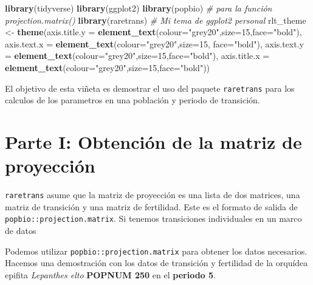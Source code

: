 \documentclass[
]{book}
\newenvironment{Shaded}{\begin{snugshade}}{\end{snugshade}}
\newcommand{\AttributeTok}[1]{\textcolor[rgb]{0.13,0.29,0.53}{#1}}
\newcommand{\CommentTok}[1]{\textcolor[rgb]{0.56,0.35,0.01}{\textit{#1}}}
\newcommand{\DecValTok}[1]{\textcolor[rgb]{0.00,0.00,0.81}{#1}}
\newcommand{\FunctionTok}[1]{\textcolor[rgb]{0.13,0.29,0.53}{\textbf{#1}}}
\newcommand{\NormalTok}[1]{#1}
\newcommand{\OtherTok}[1]{\textcolor[rgb]{0.56,0.35,0.01}{#1}}
\newcommand{\StringTok}[1]{\textcolor[rgb]{0.31,0.60,0.02}{#1}}
\theoremstyle{definition}
\theoremstyle{definition}
\theoremstyle{definition}
\theoremstyle{definition}
\theoremstyle{remark}
\begin{document}
\begin{Shaded}
\begin{Highlighting}[]
\FunctionTok{library}\NormalTok{(tidyverse)}
\FunctionTok{library}\NormalTok{(ggplot2)}
\FunctionTok{library}\NormalTok{(popbio) }\CommentTok{\# para la función projection.matrix()}
\FunctionTok{library}\NormalTok{(raretrans)}
\CommentTok{\# Mi tema de ggplot2 personal}
\NormalTok{rlt\_theme }\OtherTok{\textless{}{-}} \FunctionTok{theme}\NormalTok{(}\AttributeTok{axis.title.y =} \FunctionTok{element\_text}\NormalTok{(}\AttributeTok{colour=}\StringTok{"grey20"}\NormalTok{,}\AttributeTok{size=}\DecValTok{15}\NormalTok{,}\AttributeTok{face=}\StringTok{"bold"}\NormalTok{),}
        \AttributeTok{axis.text.x =} \FunctionTok{element\_text}\NormalTok{(}\AttributeTok{colour=}\StringTok{"grey20"}\NormalTok{,}\AttributeTok{size=}\DecValTok{15}\NormalTok{, }\AttributeTok{face=}\StringTok{"bold"}\NormalTok{),}
        \AttributeTok{axis.text.y =} \FunctionTok{element\_text}\NormalTok{(}\AttributeTok{colour=}\StringTok{"grey20"}\NormalTok{,}\AttributeTok{size=}\DecValTok{15}\NormalTok{,}\AttributeTok{face=}\StringTok{"bold"}\NormalTok{),  }
        \AttributeTok{axis.title.x =} \FunctionTok{element\_text}\NormalTok{(}\AttributeTok{colour=}\StringTok{"grey20"}\NormalTok{,}\AttributeTok{size=}\DecValTok{15}\NormalTok{,}\AttributeTok{face=}\StringTok{"bold"}\NormalTok{))}
\end{Highlighting}
\end{Shaded}

El objetivo de esta viñeta es demostrar el uso del paquete \texttt{raretrans}
para los calculos de los parametros en una población y periodo de
transición.

\hypertarget{parte-i-obtenciuxf3n-de-la-matriz-de-proyecciuxf3n}{%
\section{Parte I: Obtención de la matriz de proyección}\label{parte-i-obtenciuxf3n-de-la-matriz-de-proyecciuxf3n}}

\texttt{raretrans} asume que la matriz de proyección es una lista de dos
matrices, una matriz de transición y una matriz de fertilidad. Este es
el formato de salida de \texttt{popbio::projection.matrix}. Si tenemos
transiciones individuales en un marco de datos

Podemos utilizar \texttt{popbio::projection.matrix} para obtener los datos
necesarios. Hacemos una demostración con los datos de transición y
fertilidad de la orquídea epifita \emph{Lepanthes elto} \textbf{POPNUM 250} en el
\textbf{periodo 5}.
\end{document}

